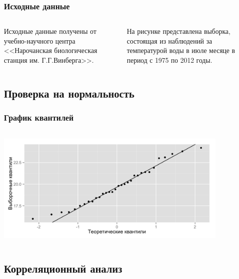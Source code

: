 \documentclass[10pt, pdf,aspectratio=169]{beamer}
\begin{document}
\begin{frame}
  \frametitle{Исходные данные}   %
  \begin{columns}[c]
  \column{2in}  %
  Исходные данные получены от учебно-научного центра <<Нарочанская биологическая станция им. Г.Г.Винберга>>.

  На рисунке представлена выборка, состоящая из наблюдений за температурой воды в июле месяце в период с 1975 по 2012 годы.
  \column{3in}
  \end{columns}
\end{frame}

\subsection{Проверка на нормальность}

\begin{frame}
  \frametitle{График квантилей}   %
   \begin{columns}[c]
   \column{4.5in}
  \includegraphics[width=4.5in]{../../figures/original/quantile.png}
  \end{columns}
\end{frame}

\subsection{Корреляционный анализ}
\end{document}
